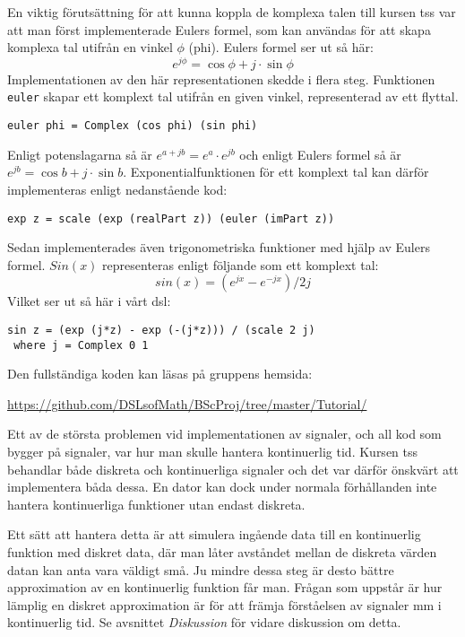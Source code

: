 \documentclass[12pt,a4paper,twoside,openright]{article}
\begin{document}
En viktig förutsättning för att kunna koppla de komplexa talen till
kursen \gls{tss} var att man först implementerade Eulers formel, som kan
användas för att skapa komplexa tal utifrån en vinkel \(\phi\)
(phi). Eulers formel ser ut så här:
\[e^{j\phi}=\cos \phi+ j \cdot \sin \phi \]
Implementationen av den här representationen skedde i flera steg.
Funktionen \texttt{euler} skapar ett komplext tal utifrån
en given vinkel, representerad av ett flyttal.
\begin{verbatim}
euler phi = Complex (cos phi) (sin phi)
\end{verbatim}
Enligt potenslagarna
så är \(e^{a+jb} = e^{a} \cdot e^{jb}\) och enligt Eulers formel så är
\(e^{j b} = \cos b + j\cdot \sin b\).
Exponentialfunktionen för ett komplext tal kan därför implementeras
enligt nedanstående kod:

\begin{verbatim}
exp z = scale (exp (realPart z)) (euler (imPart z))
\end{verbatim}
Sedan implementerades även trigonometriska funktioner med hjälp av
Eulers formel. $Sin(x)$ representeras enligt följande som ett komplext
tal:
\[ sin(x) = (e^{j x} - e^{-j x}) / 2 j \]
Vilket ser ut så här i vårt \gls{dsl}:
\begin{verbatim}
sin z = (exp (j*z) - exp (-(j*z))) / (scale 2 j)
 where j = Complex 0 1
\end{verbatim}

Den fullständiga koden kan läsas på gruppens hemsida:

\url{https://github.com/DSLsofMath/BScProj/tree/master/Tutorial/}

Ett av de största problemen vid implementationen av signaler, och all
kod som bygger på signaler, var hur man skulle hantera kontinuerlig
tid. Kursen \gls{tss} behandlar både diskreta och kontinuerliga
signaler och det var därför önskvärt att implementera båda dessa. En
dator kan dock under normala förhållanden inte hantera kontinuerliga
funktioner utan endast
diskreta. %

Ett sätt att hantera detta är att simulera ingående data till en
kontinuerlig funktion med diskret data, där man låter avståndet mellan
de diskreta värden datan kan anta vara väldigt små. Ju mindre dessa
steg är desto bättre approximation av en kontinuerlig funktion får
man. Frågan som uppstår är hur lämplig en diskret approximation är för
att främja förståelsen av signaler mm i kontinuerlig tid. Se avsnittet
\textit{Diskussion} för vidare diskussion om detta.
\end{document}
